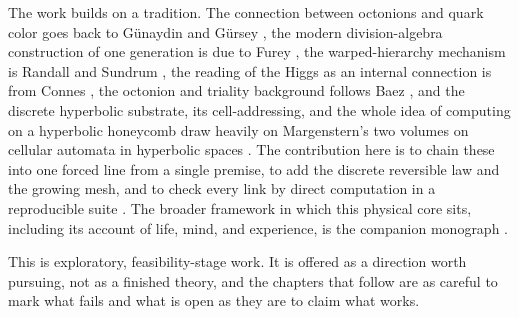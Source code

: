 The work builds on a tradition. The connection between octonions and quark color goes back to G\"unaydin and G\"ursey \cite{gunaydin1973}, the modern division-algebra construction of one generation is due to Furey \cite{furey2018}, the warped-hierarchy mechanism is Randall and Sundrum \cite{randall1999}, the reading of the Higgs as an internal connection is from Connes \cite{connes1996}, the octonion and triality background follows Baez \cite{baez2002octonions}, and the discrete hyperbolic substrate, its cell-addressing, and the whole idea of computing on a hyperbolic honeycomb draw heavily on Margenstern's two volumes on cellular automata in hyperbolic spaces \cite{margenstern2007vol1, margenstern2008vol2}. The contribution here is to chain these into one forced line from a single premise, to add the discrete reversible law and the growing mesh, and to check every link by direct computation in a reproducible suite \cite{cluesurf2026repo}. The broader framework in which this physical core sits, including its account of life, mind, and experience, is the companion monograph \cite{pollard2026vibe}.

This is exploratory, feasibility-stage work. It is offered as a direction worth pursuing, not as a finished theory, and the chapters that follow are as careful to mark what fails and what is open as they are to claim what works.
